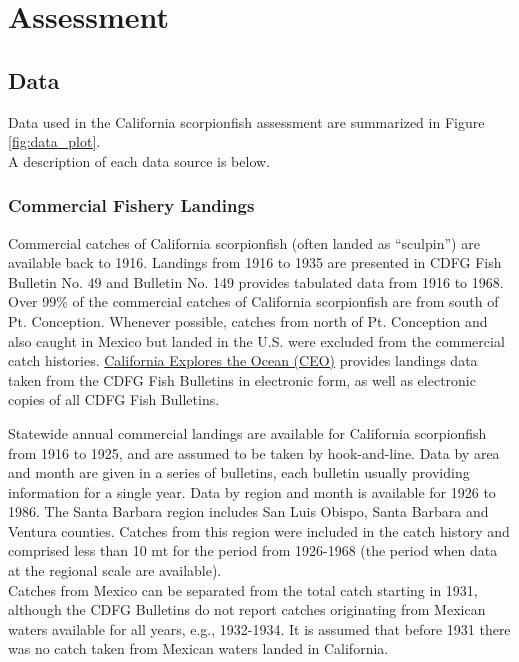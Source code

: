 \documentclass[12pt,]{article}
\begin{document}
\section{Assessment}\label{assessment}

\subsection{Data}\label{data}

Data used in the California scorpionfish assessment are summarized in
Figure \ref{fig:data_plot}.\\
A description of each data source is below.

\subsubsection{Commercial Fishery
Landings}\label{commercial-fishery-landings}

Commercial catches of California scorpionfish (often landed as
``sculpin'') are available back to 1916. Landings from 1916 to 1935 are
presented in CDFG Fish Bulletin No. 49 and Bulletin No. 149 provides
tabulated data from 1916 to 1968. Over 99\% of the commercial catches of
California scorpionfish are from south of Pt. Conception. Whenever
possible, catches from north of Pt. Conception and also caught in Mexico
but landed in the U.S. were excluded from the commercial catch
histories.
\href{http://library.ucsd.edu/ceo/fishcatchtables/fish-catch-download.html}{California
Explores the Ocean (CEO)} provides landings data taken from the CDFG
Fish Bulletins in electronic form, as well as electronic copies of all
CDFG Fish Bulletins.

Statewide annual commercial landings are available for California
scorpionfish from 1916 to 1925, and are assumed to be taken by
hook-and-line. Data by area and month are given in a series of
bulletins, each bulletin usually providing information for a single
year. Data by region and month is available for 1926 to 1986. The Santa
Barbara region includes San Luis Obispo, Santa Barbara and Ventura
counties. Catches from this region were included in the catch history
and comprised less than 10 mt for the period from 1926-1968 (the period
when data at the regional scale are available).\\
Catches from Mexico can be separated from the total catch starting in
1931, although the CDFG Bulletins do not report catches originating from
Mexican waters available for all years, e.g., 1932-1934. It is assumed
that before 1931 there was no catch taken from Mexican waters landed in
California.
\end{document}

